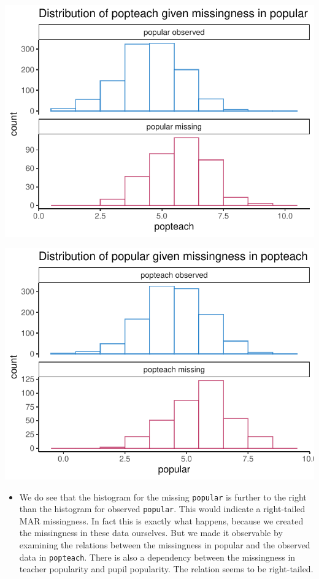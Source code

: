 \documentclass[
]{jss}
\providecommand{\tightlist}{%
  \setlength{\itemsep}{0pt}\setlength{\parskip}{0pt}}
\begin{document}
\begin{CodeChunk}


\begin{center}\includegraphics{Manuscript_files/figure-latex/pop_dist-1} \end{center}



\begin{center}\includegraphics{Manuscript_files/figure-latex/pop_dist-2} \end{center}

\end{CodeChunk}

\begin{itemize}
\tightlist
\item
  We do see that the histogram for the missing \texttt{popular} is
  further to the right than the histogram for observed \texttt{popular}.
  This would indicate a right-tailed MAR missingness. In fact this is
  exactly what happens, because we created the missingness in these data
  ourselves. But we made it observable by examining the relations
  between the missingness in popular and the observed data in
  \texttt{popteach}. There is also a dependency between the missingness
  in teacher popularity and pupil popularity. The relation seems to be
  right-tailed.
\end{itemize}
\end{document}
